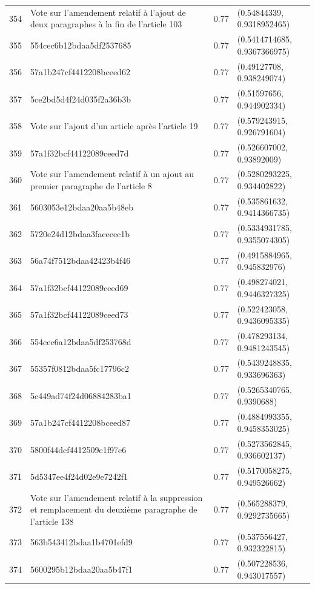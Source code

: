 \begin{table}[ht]
\begin{tabular}{rlrl}
  354 & Vote sur l'amendement relatif à l'ajout de deux paragraphes à la fin de l'article 103 & 0.77 & (0.54844339, 0.9318952465) \\ 
  355 & 554cec6b12bdaa5df2537685 & 0.77 & (0.5414714685, 0.9367366975) \\ 
  356 & 57a1b247cf4412208bceed62 & 0.77 & (0.49127708, 0.938249074) \\ 
  357 & 5ce2bd5d4f24d035f2a36b3b & 0.77 & (0.51597656, 0.944902334) \\ 
  358 & Vote sur l'ajout d'un article après l'article 19 & 0.77 & (0.579243915, 0.926791604) \\ 
  359 & 57a1f32bcf44122089ceed7d & 0.77 & (0.526607002, 0.93892009) \\ 
  360 & Vote sur l'amendement relatif à un ajout au premier paragraphe de l'article 8 & 0.77 & (0.5280293225, 0.934402822) \\ 
  361 & 5603053e12bdaa20aa5b48eb & 0.77 & (0.535861632, 0.9414366735) \\ 
  362 & 5720e24d12bdaa3facecec1b & 0.77 & (0.5334931785, 0.9355074305) \\ 
  363 & 56a74f7512bdaa42423b4f46 & 0.77 & (0.4915884965, 0.945832976) \\ 
  364 & 57a1f32bcf44122089ceed69 & 0.77 & (0.498274021, 0.9446327325) \\ 
  365 & 57a1f32bcf44122089ceed73 & 0.77 & (0.522423058, 0.9436095335) \\ 
  366 & 554cee6a12bdaa5df253768d & 0.77 & (0.478293134, 0.9481243545) \\ 
  367 & 55357f0812bdaa5fc17796c2 & 0.77 & (0.5439248835, 0.933696363) \\ 
  368 & 5c449ad74f24d06884283ba1 & 0.77 & (0.5265340765, 0.9390688) \\ 
  369 & 57a1b247cf4412208bceed87 & 0.77 & (0.4884993355, 0.9458353025) \\ 
  370 & 5800f44dcf4412509e1f97e6 & 0.77 & (0.5273562845, 0.936602137) \\ 
  371 & 5d5347ee4f24d02e9e7242f1 & 0.77 & (0.5170058275, 0.949526662) \\ 
  372 & Vote sur l'amendement relatif à la suppression et remplacement du deuxième paragraphe de l'article 138 & 0.77 & (0.565288379, 0.9292735665) \\ 
  373 & 563b543412bdaa1b4701efd9 & 0.77 & (0.537556427, 0.932322815) \\ 
  374 & 5600295b12bdaa20aa5b47f1 & 0.77 & (0.507228536, 0.943017557) \\ 

\end{tabular}
\end{table}
